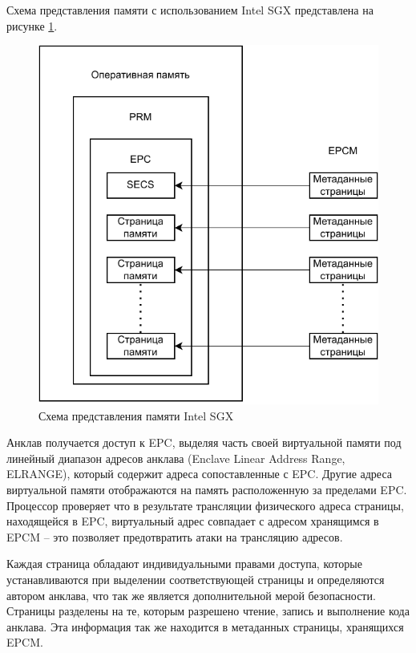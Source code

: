 Схема представления памяти с использованием Intel SGX представлена на рисунке \ref{fig:intel-prm}.

\begin{figure}[h]
	\centering
	\includegraphics[width=\textwidth]{img/intel-prm.pdf}
	\caption{Схема представления памяти Intel SGX}
	\label{fig:intel-prm}
\end{figure}

Анклав получается доступ к EPC, выделяя часть своей виртуальной памяти под линейный диапазон адресов анклава (Enclave Linear Address Range, ELRANGE), который содержит адреса сопоставленные с EPC. Другие адреса виртуальной памяти отображаются на память расположенную за пределами EPC. Процессор проверяет что в результате трансляции физического адреса страницы, находящейся в EPC, виртуальный адрес совпадает с адресом хранящимся в EPCM -- это позволяет предотвратить атаки на трансляцию адресов.

Каждая страница обладают индивидуальными правами доступа, которые устанавливаются при выделении соответствующей страницы и определяются автором анклава, что так же является дополнительной мерой безопасности. Страницы разделены на те, которым разрешено чтение, запись и выполнение кода анклава. Эта информация так же находится в метаданных страницы, хранящихся EPCM.

